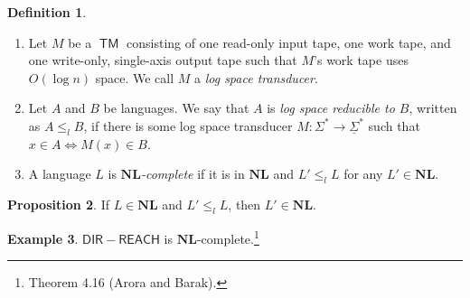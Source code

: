\documentclass[10pt,letterpaper,cm]{nupset}
\theoremstyle{definition}
\newtheorem{definition}{Definition}[subsection]
\newtheorem{exmp}[definition]{Example}
\theoremstyle{theorem}
\newtheorem{prop}[definition]{Proposition}
\theoremstyle{remark}
\newcommand{\1}{\mathbf{1}}
\newcommand{\0}{\vec 0}
\DeclareMathOperator{\TM}{\mathsf{TM}}
\begin{document}
\begin{definition} $ $
\begin{enumerate}
\item
Let $M$ be a $\TM$ consisting of one read-only input tape, one work tape, and one write-only, single-axis output tape such that $M$'s work tape uses $O(\log{n})$ space. We call $M$ a \textit{log space transducer}.
\item Let $A$ and $B$ be languages. We say that $A$ is \textit{log space reducible to $B$}, written as $A\leq_l B$, if there is some log space transducer $M: \Sigma^{\ast} \to \underline{\Sigma}^{\ast}$ such that $x \in A \iff M(x) \in B$. 
\item A language $L$ is \textit{$\mathbf{NL}$-complete} if it is in $\mathbf{NL}$ and $L' \leq_l L$ for any $L' \in \mathbf{NL}$.
\end{enumerate}
\end{definition}

\begin{prop}
If $L \in \mathbf{NL}$ and $L' \leq_l L$, then  $L' \in \mathbf{NL}$.
\end{prop}

\begin{exmp}
$\mathsf{DIR{-}REACH}$ is $\mathbf{NL}$-complete.\footnote{Theorem 4.16 (Arora and Barak).}
\end{exmp}
\end{document}
